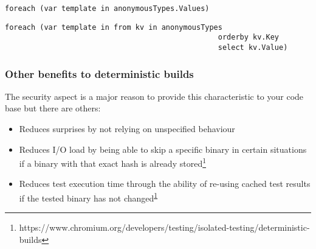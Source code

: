 \begin{lstlisting}[label={lst:undeterministic-values}]
foreach (var template in anonymousTypes.Values)
\end{lstlisting}

\begin{lstlisting}[label={lst:deterministic-values}]
foreach (var template in from kv in anonymousTypes 
												 orderby kv.Key 
												 select kv.Value)
\end{lstlisting}

\subsubsection{Other benefits to deterministic builds}
\label{sec:deterministic-builds-benefits}

The security aspect is a major reason to provide this characteristic to your code base but there are others:

\begin{itemize}
\item Reduces surprises by not relying on unspecified behaviour
\item Reduces I/O load by being able to skip a specific binary in certain situations if a binary with that exact hash is already stored\footnote{\label{ft:chromium}https://www.chromium.org/developers/testing/isolated-testing/deterministic-builds}
\item Reduces test execution time through the ability of re-using cached test results if the tested binary has not changed\textsuperscript{\ref{ft:chromium}}
\end{itemize}